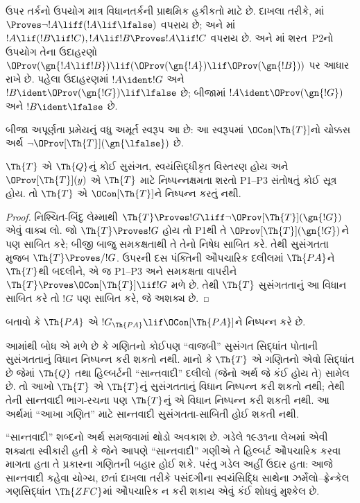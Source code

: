 ઉપર તર્કનો ઉપયોગ માત્ર વિધાનતર્કની પ્રાથમિક હકીકતો માટે છે. દાખલા તરીકે, માં $\Proves \lnot!A \liff (!A\lif\lfalse)$ વપરાય છે; અને માં $!A \lif (!B \lif !C), !A \lif !B \Proves !A \lif !C$ વપરાય છે.  અને માં શરત~P2નો ઉપયોગ તેના ઉદાહરણો $\OProv(\gn{!A \lif !B}) \lif (\OProv(\gn{!A}) \lif \OProv(\gn{!B}))$ પર આધાર રાખે છે. પહેલા ઉદાહરણમાં $!A \ident !G$ અને $!B \ident \OProv(\gn{!G}) \lif \lfalse$ છે; બીજામાં $!A \ident \OProv(\gn{!G})$ અને $!B \ident \lfalse$ છે.

બીજા અપૂર્ણતા પ્રમેયનું વધુ અમૂર્ત સ્વરૂપ આ છે:
આ સ્વરૂપમાં $\OCon[\Th{T}]$નો ચોક્કસ અર્થ
$\lnot\OProv[\Th{T}](\gn{\lfalse})$ છે.

\begin{thm}
$\Th{T}$ એ $\Th{Q}$નું કોઈ સુસંગત, સ્વયંસિદ્ધીકૃત વિસ્તરણ હોય અને $\OProv[\Th{T}](y)$ એ $\Th{T}$ માટે નિષ્પન્નક્ષમતા શરતો P1--P3 સંતોષતું કોઈ સૂત્ર હોય. તો $\Th{T}$ એ $\OCon[\Th{T}]$ને નિષ્પન્ન કરતું નથી.
\end{thm}
\begin{proof}
નિશ્ચિત-બિંદુ લેમ્માથી $\Th{T}\Proves
!G\liff\lnot\OProv[\Th{T}](\gn{!G})$ એવું વાક્ય
લો. જો $\Th{T}\Proves !G$ હોય તો P1થી તે
$\OProv[\Th{T}](\gn{!G})$ને પણ સાબિત કરે; બીજી
બાજુ સમકક્ષતાથી તે તેનો નિષેધ સાબિત કરે. તેથી
સુસંગતતા મુજબ $\Th{T}\Proves/ !G$.
ઉપરની દસ પંક્તિની ઔપચારિક દલીલમાં $\Th{PA}$ને
$\Th{T}$થી બદલીને, એ જ P1--P3 અને સમકક્ષતા
વાપરીને $\Th{T}\Proves\OCon[\Th{T}]\lif !G$
મળે છે. તેથી $\Th{T}$ સુસંગતતાનું આ વિધાન સાબિત
કરે તો $!G$ પણ સાબિત કરે, જે અશક્ય છે.
\end{proof}

\begin{prob}
બતાવો કે $\Th{PA}$ એ $!G_{\Th{PA}} \lif \OCon[\Th{PA}]$ને નિષ્પન્ન કરે છે.
\end{prob}

\begin{digress}
આમાંથી બોધ એ મળે છે કે ગણિતનો કોઈપણ ``વાજબી'' સુસંગત સિદ્ધાંત પોતાની સુસંગતતાનું વિધાન નિષ્પન્ન કરી શકતો નથી. માનો કે $\Th{T}$ એ ગણિતનો એવો સિદ્ધાંત છે જેમાં $\Th{Q}$ તથા હિલ્બર્ટની ``સાન્તવાદી'' દલીલો (જેનો અર્થ જે કંઈ હોય તે) સામેલ છે. તો આખો $\Th{T}$ એ $\Th{T}$નું સુસંગતતાનું વિધાન નિષ્પન્ન કરી શકતો નથી; તેથી તેની સાન્તવાદી ભાગ-રચના પણ $\Th{T}$નું એ વિધાન નિષ્પન્ન કરી શકતી નથી. આ અર્થમાં ``આખા ગણિત'' માટે સાન્તવાદી સુસંગતતા-સાબિતી હોઈ શકતી નથી.

``સાન્તવાદી'' શબ્દનો અર્થ સમજવામાં થોડો અવકાશ છે. ગડેલે ૧૯૩૧ના લેખમાં એવી શક્યતા સ્વીકારી હતી કે જેને આપણે ``સાન્તવાદી'' ગણીએ તે હિલ્બર્ટ ઔપચારિક કરવા માગતા હતા તે પ્રકારના ગણિતની બહાર હોઈ શકે. પરંતુ ગડેલ અહીં ઉદાર હતા: આજે સાન્તવાદી કહેવા યોગ્ય, છતાં દાખલા તરીકે પસંદગીના સ્વયંસિદ્ધિ સાથેના ઝર્મેલો--ફ્રેન્કેલ ગણસિદ્ધાંત $\Th{ZFC}$માં ઔપચારિક ન કરી શકાય એવું કંઈ શોધવું મુશ્કેલ છે.
\end{digress}
\endgroup


